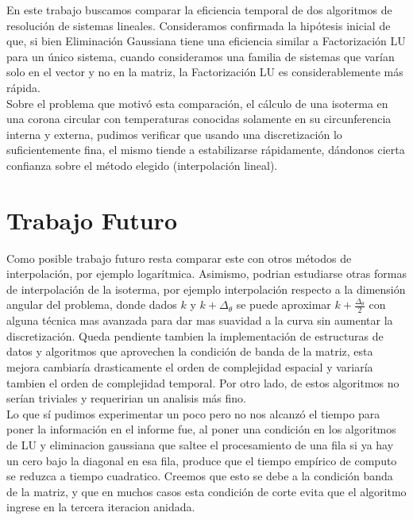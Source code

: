 
En este trabajo buscamos comparar la eficiencia temporal de dos algoritmos de resolución de sistemas lineales. Consideramos confirmada la hipótesis inicial de que, si bien Eliminación Gaussiana tiene una eficiencia similar a Factorización LU para un único sistema, cuando consideramos una familia de sistemas que varían solo en el vector y no en la matriz, la Factorización LU es considerablemente más rápida. \\

Sobre el problema que motivó esta comparación, el cálculo de una isoterma en una corona circular con temperaturas conocidas solamente en su circunferencia interna y externa, pudimos verificar que usando una discretización lo suficientemente fina, el mismo tiende a estabilizarse rápidamente, dándonos cierta confianza sobre el método elegido (interpolación lineal).\\

\section{Trabajo Futuro}
 Como posible trabajo futuro resta comparar este con otros métodos de interpolación, por ejemplo logarítmica. Asimismo, podrian estudiarse otras formas de interpolación de la isoterma, por ejemplo interpolación respecto a la dimensión angular del problema, donde dados $k$ y $k + \Delta_\theta$ se puede aproximar $k + \frac{\Delta_\theta}{2}$ con alguna técnica mas avanzada para dar mas suavidad a la curva sin aumentar la discretización. Queda pendiente tambien la implementación de estructuras de datos y algoritmos que aprovechen la condición de banda de la matriz, esta mejora cambiaría drasticamente el orden de complejidad espacial y variaría tambien el orden de complejidad temporal. Por otro lado, de estos algoritmos no serían triviales y requeririan un analisis más fino.\\
 
 Lo que sí pudimos experimentar un poco pero no nos alcanzó el tiempo para poner la información en el informe fue, al poner una condición en los algoritmos de LU y eliminacion gaussiana que saltee el procesamiento de una fila si ya hay un cero bajo la diagonal en esa fila, produce que el tiempo empírico de computo se reduzca a tiempo cuadratico. Creemos que esto se debe a la condición banda de la matriz, y que en muchos casos esta condición de corte evita que el algoritmo ingrese en la tercera iteracion anidada.